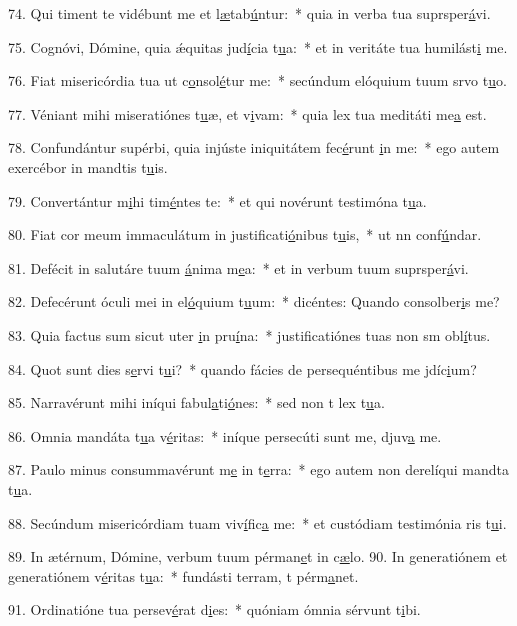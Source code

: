 74. Qui timent te vidébunt me et l\uline{æ}tab\uline{ú}ntur:~* quia in verba tua suprsper\uline{á}vi.\par 
75. Cognóvi, Dómine, quia ǽquitas jud\uline{í}cia t\uline{u}a:~* et in veritáte tua humilást\uline{i} me.\par 
76. Fiat misericórdia tua ut c\uline{o}nsol\uline{é}tur me:~* secúndum elóquium tuum srvo t\uline{u}o.\par 
77. Véniant mihi miseratiónes t\uline{u}æ, et v\uline{i}vam:~* quia lex tua meditáti me\uline{a} est.\par 
78. Confundántur supérbi, quia injúste iniquitátem fec\uline{é}runt \uline{i}n me:~* ego autem exercébor in mandtis t\uline{u}is.\par 
79. Convertántur m\uline{i}hi tim\uline{é}ntes te:~* et qui novérunt testimóna t\uline{u}a.\par 
80. Fiat cor meum immaculátum in justificati\uline{ó}nibus t\uline{u}is,~* ut nn conf\uline{ú}ndar.\par 
81. Defécit in salutáre tuum \uline{á}nima m\uline{e}a:~* et in verbum tuum suprsper\uline{á}vi.\par 
82. Defecérunt óculi mei in el\uline{ó}quium t\uline{u}um:~* dicéntes: Quando consolber\uline{i}s me?\par 
83. Quia factus sum sicut uter \uline{i}n pru\uline{í}na:~* justificatiónes tuas non sm obl\uline{í}tus.\par 
84. Quot sunt dies s\uline{e}rvi t\uline{u}i?~* quando fácies de persequéntibus me jdíc\uline{i}um?\par 
85. Narravérunt mihi iníqui fabul\uline{a}ti\uline{ó}nes:~* sed non t lex t\uline{u}a.\par 
86. Omnia mandáta t\uline{u}a v\uline{é}ritas:~* iníque persecúti sunt me, djuv\uline{a} me.\par 
87. Paulo minus consummavérunt m\uline{e} in t\uline{e}rra:~* ego autem non derelíqui mandta t\uline{u}a.\par 
88. Secúndum misericórdiam tuam viv\uline{í}fic\uline{a} me:~* et custódiam testimónia ris t\uline{u}i.\par 
89. In ætérnum, Dómine, verbum tuum pérman\uline{e}t in c\uline{æ}lo.
90. In generatiónem et generatiónem v\uline{é}ritas t\uline{u}a:~* fundásti terram, t pérm\uline{a}net.\par 
91. Ordinatióne tua persev\uline{é}rat d\uline{i}es:~* quóniam ómnia sérvunt t\uline{i}bi.\par 
